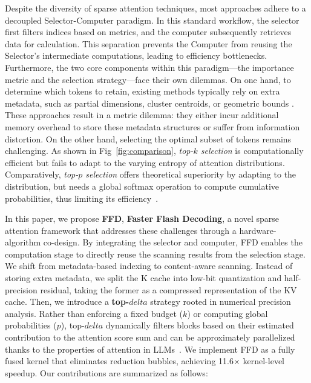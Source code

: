 \documentclass[]{mosi}
\def\bm#1{#1}%
\def\delta{delta}%
\theoremstyle{plain}
\theoremstyle{definition}
\theoremstyle{remark}
\begin{document}
Despite the diversity of sparse attention techniques, most approaches adhere to a decoupled Selector-Computer paradigm. In this standard workflow, the selector first filters indices based on metrics, and the computer subsequently retrieves data for calculation. This separation prevents the Computer from reusing the Selector's intermediate computations, leading to efficiency bottlenecks. Furthermore, the two core components within this paradigm—the importance metric and the selection strategy—face their own dilemmas. On one hand, to determine which tokens to retain, existing methods typically rely on extra metadata, such as partial dimensions, cluster centroids, or geometric bounds \citep{ribar2023sparq, xiao2024infllm, tang2024quest}. These approaches result in a metric dilemma: they either incur additional memory overhead to store these metadata structures or suffer from information distortion. On the other hand, selecting the optimal subset of tokens remains challenging. As shown in Fig~\ref{fig:comparison}, \textit{top-$k$ selection} is computationally efficient but fails to adapt to the varying entropy of attention distributions\citep{zhang2023h2o, ge2023model}. Comparatively, \textit{top-$p$ selection} offers theoretical superiority by adapting to the distribution, but needs a global softmax operation to compute cumulative probabilities, thus limiting its efficiency~\citep{lin2025twilight}.

In this paper, we propose \textbf{FFD}, \textbf{Faster Flash Decoding}, a novel sparse attention framework that addresses these challenges through a hardware-algorithm co-design. By integrating the selector and computer, FFD enables the computation stage to directly reuse the scanning results from the selection stage. We shift from metadata-based indexing to content-aware scanning. Instead of storing extra metadata, we split the K cache into low-bit quantization and half-precision residual, taking the former as a compressed representation of the KV cache. Then, we introduce a \textbf{top-$\bm\delta$} strategy rooted in numerical precision analysis. Rather than enforcing a fixed budget ($k$) or computing global probabilities ($p$), top-$\delta$ dynamically filters blocks based on their estimated contribution to the attention score sum and can be approximately parallelized thanks to the properties of attention in LLMs~\citep{xiao2023efficient}. We implement FFD as a fully fused kernel that eliminates reduction bubbles, achieving 11.6$\times$ kernel-level speedup. Our contributions are summarized as follows:
\end{document}
